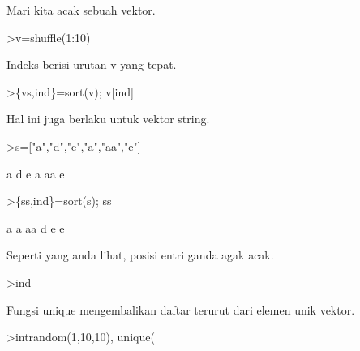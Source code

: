 \documentclass[a4paper,10pt]{article}
\begin{document}
\begin{eulernotebook}
\begin{eulercomment}
\begin{eulercomment}
\begin{eulercomment}
\begin{eulercomment}
\begin{eulercomment}
Mari kita acak sebuah vektor.
\end{eulercomment}
\begin{eulerprompt}
>v=shuffle(1:10)
\end{eulerprompt}
\begin{euleroutput}
  [4,  5,  10,  6,  8,  9,  1,  7,  2,  3]
\end{euleroutput}
\begin{eulercomment}
Indeks berisi urutan v yang tepat.
\end{eulercomment}
\begin{eulerprompt}
>\{vs,ind\}=sort(v); v[ind]
\end{eulerprompt}
\begin{euleroutput}
  [1,  2,  3,  4,  5,  6,  7,  8,  9,  10]
\end{euleroutput}
\begin{eulercomment}
Hal ini juga berlaku untuk vektor string.
\end{eulercomment}
\begin{eulerprompt}
>s=["a","d","e","a","aa","e"]
\end{eulerprompt}
\begin{euleroutput}
  a
  d
  e
  a
  aa
  e
\end{euleroutput}
\begin{eulerprompt}
>\{ss,ind\}=sort(s); ss
\end{eulerprompt}
\begin{euleroutput}
  a
  a
  aa
  d
  e
  e
\end{euleroutput}
\begin{eulercomment}
Seperti yang anda lihat, posisi entri ganda agak acak.
\end{eulercomment}
\begin{eulerprompt}
>ind
\end{eulerprompt}
\begin{euleroutput}
  [4,  1,  5,  2,  6,  3]
\end{euleroutput}
\begin{eulercomment}
Fungsi unique mengembalikan daftar terurut dari elemen unik vektor.
\end{eulercomment}
\begin{eulerprompt}
>intrandom(1,10,10), unique(%
\end{eulerprompt}
\begin{euleroutput}
  [4,  4,  9,  2,  6,  5,  10,  6,  5,  1]
  [1,  2,  4,  5,  6,  9,  10]
\end{euleroutput}
\begin{eulercomment}

\end{eulercomment}
\end{eulercomment}
\end{eulercomment}
\end{eulercomment}
\end{eulercomment}
\end{eulernotebook}
\end{document}
